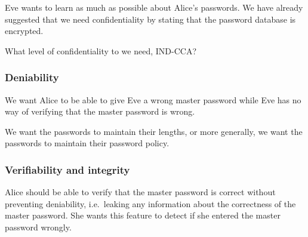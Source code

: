 Eve wants to learn as much as possible about Alice's passwords.
We have already suggested that we need confidentiality by stating that the 
password database is encrypted.

What level of confidentiality to we need, \ac{IND-CCA}?

\subsubsection{Deniability}

We want Alice to be able to give Eve a wrong master password while Eve has no 
way of verifying that the master password is wrong.

We want the passwords to maintain their lengths, or more generally, we want the 
passwords to maintain their password policy.

\subsubsection{Verifiability and integrity}

Alice should be able to verify that the master password is correct without 
preventing deniability, i.e.\ leaking any information about the correctness of 
the master password.
She wants this feature to detect if she entered the master password wrongly.
